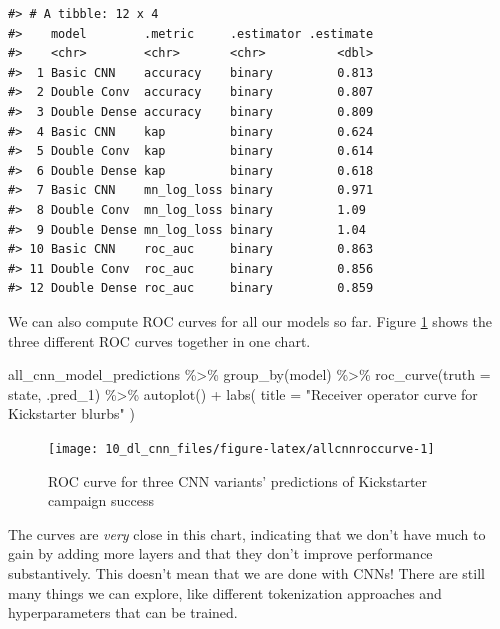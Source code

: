 \documentclass[
]{krantz}
\makeatletter
\newenvironment{Shaded}{\begin{snugshade}}{\end{snugshade}}
\newcommand{\AttributeTok}[1]{\textcolor[rgb]{0.77,0.63,0.00}{#1}}
\newcommand{\FunctionTok}[1]{\textcolor[rgb]{0.00,0.00,0.00}{#1}}
\newcommand{\NormalTok}[1]{#1}
\newcommand{\SpecialCharTok}[1]{\textcolor[rgb]{0.00,0.00,0.00}{#1}}
\newcommand{\StringTok}[1]{\textcolor[rgb]{0.31,0.60,0.02}{#1}}
\newenvironment{kframe}{%
\medskip{}
\setlength{\fboxsep}{.8em}
 \def\at@end@of@kframe{}%
 \ifinner\ifhmode%
  \def\at@end@of@kframe{\end{minipage}}%
  \begin{minipage}{\columnwidth}%
 \fi\fi%
 \def\FrameCommand##1{\hskip\@totalleftmargin \hskip-\fboxsep
 \colorbox{shadecolor}{##1}\hskip-\fboxsep
     \hskip-\linewidth \hskip-\@totalleftmargin \hskip\columnwidth}%
 \MakeFramed {\advance\hsize-\width
   \@totalleftmargin\z@ \linewidth\hsize
   \@setminipage}}%
 {\par\unskip\endMakeFramed%
 \at@end@of@kframe}
\renewenvironment{Shaded}{\begin{kframe}}{\end{kframe}}
\makeatother
\begin{document}
\begin{verbatim}
#> # A tibble: 12 x 4
#>    model        .metric     .estimator .estimate
#>    <chr>        <chr>       <chr>          <dbl>
#>  1 Basic CNN    accuracy    binary         0.813
#>  2 Double Conv  accuracy    binary         0.807
#>  3 Double Dense accuracy    binary         0.809
#>  4 Basic CNN    kap         binary         0.624
#>  5 Double Conv  kap         binary         0.614
#>  6 Double Dense kap         binary         0.618
#>  7 Basic CNN    mn_log_loss binary         0.971
#>  8 Double Conv  mn_log_loss binary         1.09 
#>  9 Double Dense mn_log_loss binary         1.04 
#> 10 Basic CNN    roc_auc     binary         0.863
#> 11 Double Conv  roc_auc     binary         0.856
#> 12 Double Dense roc_auc     binary         0.859
\end{verbatim}

We can also compute ROC curves for all our models so far. Figure \ref{fig:allcnnroccurve} shows the three different ROC curves together in one chart.

\begin{Shaded}
\begin{Highlighting}[]
\NormalTok{all\_cnn\_model\_predictions }\SpecialCharTok{\%\textgreater{}\%}
  \FunctionTok{group\_by}\NormalTok{(model) }\SpecialCharTok{\%\textgreater{}\%}
  \FunctionTok{roc\_curve}\NormalTok{(}\AttributeTok{truth =}\NormalTok{ state, .pred\_1) }\SpecialCharTok{\%\textgreater{}\%}
  \FunctionTok{autoplot}\NormalTok{() }\SpecialCharTok{+}
  \FunctionTok{labs}\NormalTok{(}
    \AttributeTok{title =} \StringTok{"Receiver operator curve for Kickstarter blurbs"}
\NormalTok{  )}
\end{Highlighting}
\end{Shaded}

\begin{figure}

{\centering \texttt{[image: 10\_dl\_cnn\_files/figure-latex/allcnnroccurve-1]} 

}

\caption{ROC curve for three CNN variants' predictions of Kickstarter campaign success}\label{fig:allcnnroccurve}
\end{figure}

The curves are \emph{very} close in this chart, indicating that we don't have much to gain by adding more layers and that they don't improve performance substantively.
This doesn't mean that we are done with CNNs! There are still many things we can explore, like different tokenization approaches and hyperparameters that can be trained.
\end{document}
